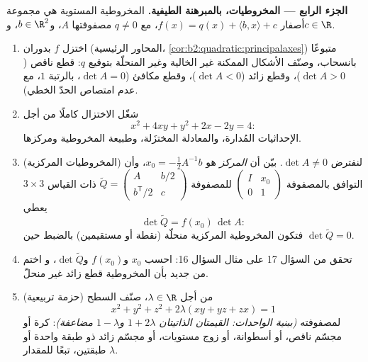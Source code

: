 \begin{problem}
\medskip
\noindent\textbf{الجزء الرابع --- المخروطيات، بالمبرهنة الطيفية.}
المخروطية المستوية هي مجموعة أصفار $f(x) = q(x) + \langle b,
x\rangle + c$، مع $q \neq 0$  مصفوفتها $A$،
و$b \in \R^2$، و$c \in \R$.
\begin{enumerate}[resume]
  \item اختزل $f$ بدوران (المحاور الرئيسية،
        \cref{cor:b2:quadratic:principalaxes}) متبوعًا
        بانسحاب، وصنّف الأشكال الممكنة غير الخالية وغير
        المنحلّة بتوقيع $q$: قطع ناقص
        ($\det A > 0$)، وقطع زائد ($\det A < 0$)، وقطع مكافئ
        ($\det A = 0$، بالرتبة $1$، مع عدم امتصاص الحدّ الخطي).
  \item شغّل الاختزال كاملًا من أجل
        \[
        x^2 + 4xy + y^2 + 2x - 2y = 4 :
        \]
        الإحداثيات المُدارة، والمعادلة المختزَلة، وطبيعة
        المخروطية ومركزها.
  \item (المخروطيات المركزية) لنفترض $\det A \neq 0$. بيّن أن
        \emph{المركز} هو $x_0 = -\frac12 A^{-1}b$، وأن
        التوافق بالمصفوفة $\begin{pmatrix} I & x_0\\ 0 &
        1\end{pmatrix}$ للمصفوفة $\widetilde Q
        = \begin{pmatrix} A & b/2 \\ b^{\mathsf T}/2 &
        c\end{pmatrix}$ ذات القياس $3\times3$ يعطي
        \[
        \det\widetilde Q = f(x_0)\,\det A :
        \]
        فتكون المخروطية المركزية منحلّة (نقطة أو مستقيمين)
        بالضبط حين $\det\widetilde Q = 0$.
  \item تحقق من السؤال 17 على مثال السؤال 16:
        احسب $x_0$ و$f(x_0)$ و$\det\widetilde Q$، و
        اختم من جديد بأن المخروطية قطع زائد غير
        منحلّ.
  \item (حزمة تربيعية) من أجل $\lambda \in \R$، صنّف
        السطح
        \[
        x^2 + y^2 + z^2 + 2\lambda(xy + yz + zx) = 1
        \]
         لمصفوفته \emph{(ببنية الواحدات:
        القيمتان الذاتيتان $1 + 2\lambda$ و$1 -
        \lambda$ مضاعفة)}: كرة أو مجسّم ناقص، أو أسطوانة، أو زوج
        مستويات، أو مجسّم زائد ذو طبقة واحدة أو طبقتين، تبعًا
        للمقدار $\lambda$.
\end{enumerate}


\end{problem}
